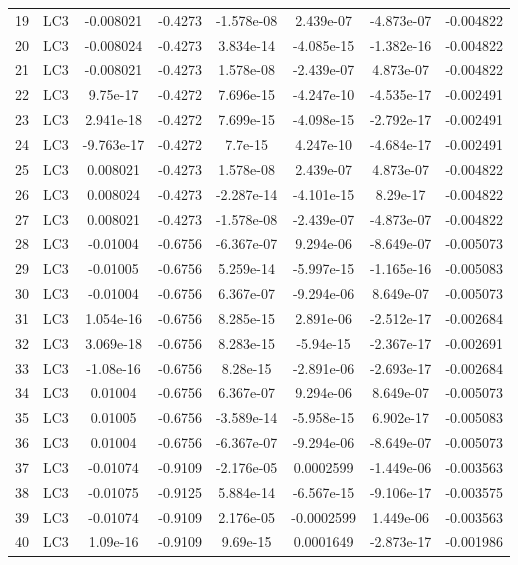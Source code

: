 \documentclass{article}%
\begin{document}
\begin{longtable}{| c c | c c c c c c |}
19&LC3&{-}0.008021&{-}0.4273&{-}1.578e{-}08&2.439e{-}07&{-}4.873e{-}07&{-}0.004822\\%
20&LC3&{-}0.008024&{-}0.4273&3.834e{-}14&{-}4.085e{-}15&{-}1.382e{-}16&{-}0.004822\\%
21&LC3&{-}0.008021&{-}0.4273&1.578e{-}08&{-}2.439e{-}07&4.873e{-}07&{-}0.004822\\%
22&LC3&9.75e{-}17&{-}0.4272&7.696e{-}15&{-}4.247e{-}10&{-}4.535e{-}17&{-}0.002491\\%
23&LC3&2.941e{-}18&{-}0.4272&7.699e{-}15&{-}4.098e{-}15&{-}2.792e{-}17&{-}0.002491\\%
24&LC3&{-}9.763e{-}17&{-}0.4272&7.7e{-}15&4.247e{-}10&{-}4.684e{-}17&{-}0.002491\\%
25&LC3&0.008021&{-}0.4273&1.578e{-}08&2.439e{-}07&4.873e{-}07&{-}0.004822\\%
26&LC3&0.008024&{-}0.4273&{-}2.287e{-}14&{-}4.101e{-}15&8.29e{-}17&{-}0.004822\\%
27&LC3&0.008021&{-}0.4273&{-}1.578e{-}08&{-}2.439e{-}07&{-}4.873e{-}07&{-}0.004822\\%
28&LC3&{-}0.01004&{-}0.6756&{-}6.367e{-}07&9.294e{-}06&{-}8.649e{-}07&{-}0.005073\\%
29&LC3&{-}0.01005&{-}0.6756&5.259e{-}14&{-}5.997e{-}15&{-}1.165e{-}16&{-}0.005083\\%
30&LC3&{-}0.01004&{-}0.6756&6.367e{-}07&{-}9.294e{-}06&8.649e{-}07&{-}0.005073\\%
31&LC3&1.054e{-}16&{-}0.6756&8.285e{-}15&2.891e{-}06&{-}2.512e{-}17&{-}0.002684\\%
32&LC3&3.069e{-}18&{-}0.6756&8.283e{-}15&{-}5.94e{-}15&{-}2.367e{-}17&{-}0.002691\\%
33&LC3&{-}1.08e{-}16&{-}0.6756&8.28e{-}15&{-}2.891e{-}06&{-}2.693e{-}17&{-}0.002684\\%
34&LC3&0.01004&{-}0.6756&6.367e{-}07&9.294e{-}06&8.649e{-}07&{-}0.005073\\%
35&LC3&0.01005&{-}0.6756&{-}3.589e{-}14&{-}5.958e{-}15&6.902e{-}17&{-}0.005083\\%
36&LC3&0.01004&{-}0.6756&{-}6.367e{-}07&{-}9.294e{-}06&{-}8.649e{-}07&{-}0.005073\\%
37&LC3&{-}0.01074&{-}0.9109&{-}2.176e{-}05&0.0002599&{-}1.449e{-}06&{-}0.003563\\%
38&LC3&{-}0.01075&{-}0.9125&5.884e{-}14&{-}6.567e{-}15&{-}9.106e{-}17&{-}0.003575\\%
39&LC3&{-}0.01074&{-}0.9109&2.176e{-}05&{-}0.0002599&1.449e{-}06&{-}0.003563\\%
40&LC3&1.09e{-}16&{-}0.9109&9.69e{-}15&0.0001649&{-}2.873e{-}17&{-}0.001986\\%

\end{longtable}
\end{document}
